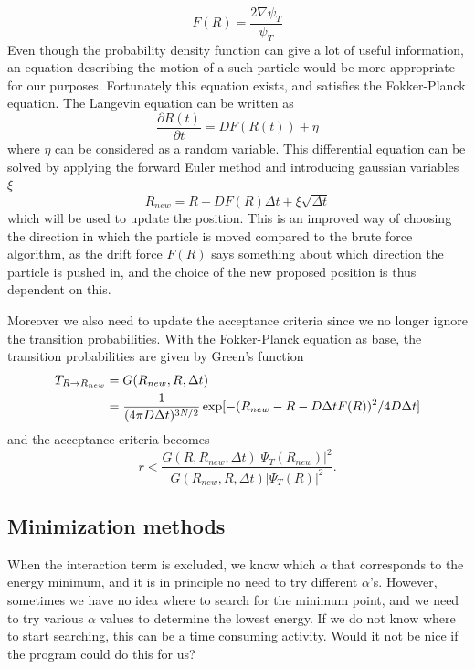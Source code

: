 \documentclass[norsk,a4paper,12pt]{article}
\begin{document}
\begin{equation}
	\label{eq:drift_force}
	F(R) = \frac{2 \nabla \psi_T}{\psi_T}
\end{equation}
Even though the probability density function can give a lot of useful information, an equation describing the motion of a such particle would be more appropriate for our purposes. Fortunately this equation exists, and satisfies the Fokker-Planck equation. The Langevin equation can be written as
\begin{equation}
\frac{\partial R(t)}{\partial t}=DF(R(t)) + \eta
\end{equation}
where $\eta$ can be considered as a random variable. This differential equation can be solved by applying the forward Euler method and introducing gaussian variables $\xi$
\begin{equation}
R_{new} = R + DF(R)\Delta t + \xi\sqrt{\Delta t}
\end{equation}
which will be used to update the position. This is an improved way of choosing the direction in which the particle is moved compared to the brute force algorithm, as the drift force $F(R)$ says something about which direction the particle is pushed in, and the choice of the new proposed position is thus dependent on this.

Moreover we also need to update the acceptance criteria since we no longer ignore the transition probabilities. With the Fokker-Planck equation as base, the transition probabilities are given by Green's function
\begin{align}
T_{R\rightarrow R_{new}}&=G(R_{new},R,\Delta t)\notag\\
&=\frac{1}{(4\pi D\Delta t)^{3N/2}}\exp[-(R_{new} - R - D\Delta tF(R))^2/4D\Delta t] 
\end{align}
and the acceptance criteria becomes
\begin{equation}
r<\frac{G(R,R_{new},\Delta t)|\Psi_T(R_{new})|^2}{G(R_{new},R,\Delta t)|\Psi_T(R)|^2}.
\end{equation}



\subsection{Minimization methods}
When the interaction term is excluded, we know which $\alpha$ that corresponds to the energy minimum, and it is in principle no need to try different $\alpha$'s. However, sometimes we have no idea where to search for the minimum point, and we need to try various $\alpha$ values to determine the lowest energy. If we do not know where to start searching, this can be a time consuming activity. Would it not be nice if the program could do this for us?
\end{document}
